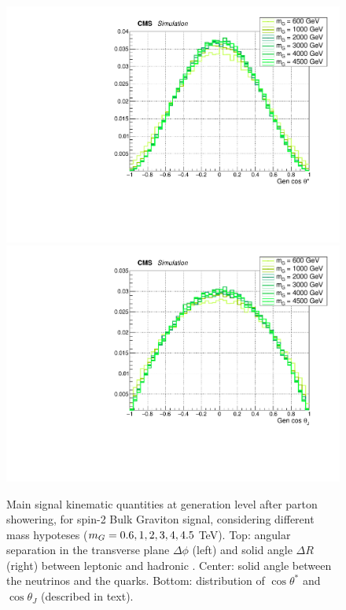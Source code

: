 \begin{figure}[!htb]
\begin{center}
     \includegraphics[width=.495\textwidth]{Gen_v9/XZZInv_g_CosThetaStar.pdf}%
     \includegraphics[width=.495\textwidth]{Gen_v9/XZZInv_g_CosThetaJ.pdf}%
   \end{center}
   \caption{Main signal kinematic quantities at generation level after parton showering, for spin-2 Bulk Graviton signal, considering different mass hypoteses ($m_{G} = 0.6, 1, 2, 3, 4, 4.5$ TeV). Top: angular separation in the transverse plane $\Delta \phi$ (left) and solid angle $\Delta R$ (right) between leptonic \Z and hadronic \Z. Center: solid angle between the neutrinos and the quarks. Bottom: distribution of $\cos{\theta}^{*}$ and $\cos{\theta}_{J}$ (described in text).}
   \label{fig:genGravSignal3}
 \end{figure}

